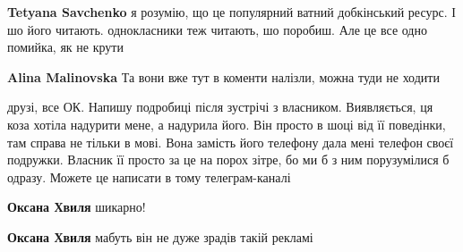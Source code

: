 \begin{itemize}
\begin{itemize}
 
\textbf{Tetyana Savchenko} я розумію, що це популярний ватний добкінський
ресурс. І шо його читають. однокласники теж читають, шо поробиш. Але це все
одно помийка, як не крути

 
\textbf{Alina Malinovska} Та вони вже тут в коменти налізли, можна туди не ходити

 
друзі, все ОК. Напишу подробиці після зустрічі з власником. Виявляється, ця
коза хотіла надурити мене, а надурила його. Він просто в шоці від її поведінки,
там справа не тільки в мові. Вона замість його телефону дала мені телефон своєї
подружки. Власник її просто за це на порох зітре, бо ми б з ним порузумілися б
одразу. Можете це написати в тому телеграм-каналі

 
\textbf{Оксана Хвиля} шикарно!

 
\textbf{Оксана Хвиля} мабуть він не дуже зрадів такій рекламі

 

\end{itemize}
\end{itemize}
